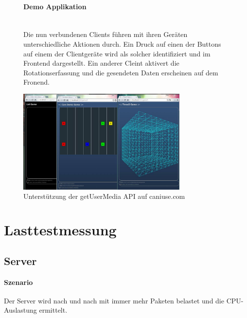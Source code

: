 \documentclass[a4paper]{spie}  %
\begin{document}
\begin{figure}[H]
\begin{minipage}[t]{0.4\textwidth}
\vspace{0pt}
\paragraph{Demo Applikation}\mbox{}\\
Die nun verbundenen Clients führen mit ihren Geräten unterschiedliche Aktionen durch. Ein Druck auf einen der Buttons auf einem der Clientgeräte wird als solcher identifiziert und im Frontend dargestellt. Ein anderer Cleint aktivert die Rotationserfassung und die gesendeten Daten erscheinen auf dem Fronend.

\end{minipage}
\hfill
\begin{minipage}[t]{0.5\textwidth}
\vspace{0pt}
    \includegraphics[width=8.5cm]{images/demoGames}
     \caption{Unterstützung der getUserMedia API auf caniuse.com}
		\label{fig:test2}
\end{minipage}
\end{figure}







\section{Lasttestmessung}\label{Lasttestmessung} %

\subsection{Server}

\paragraph{Szenario} 
Der Server wird nach und nach mit immer mehr Paketen belastet und die CPU-Auslastung ermittelt.
\end{document}
